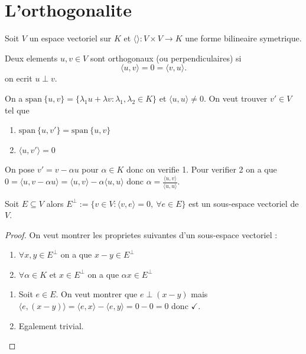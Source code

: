 

\section{L'orthogonalite}

Soit $V$ un espace vectoriel sur $K$ et $\langle  \rangle:V\times V\to K$ une forme bilineaire symetrique.
\begin{definition}
Deux elements $u,v\in V$ sont orthogonaux (ou perpendiculaires) si 
$$
\langle u,v \rangle =0=\langle v,u \rangle .
$$
on ecrit $u\perp v$.
\end{definition}

On a $\mathrm{span}~\{ u,v \}=\{ \lambda_{1}u+\lambda v:\lambda_{1},\lambda_{2}\in K \}$ et $\langle u,u \rangle\neq 0$. On veut trouver $v'\in V$ tel que 
\begin{enumerate}
\item $\mathrm{span}~\{ u,v' \}=\mathrm{span}~\{ u,v \}$
\item $\langle u,v' \rangle=0$
\end{enumerate}

On pose $v'=v-\alpha u$ pour $\alpha \in K$ donc on verifie 1. Pour verifier 2 on a que $0=\langle u,v-\alpha u \rangle=\langle u,v \rangle-\alpha \langle u,u \rangle$ donc $\alpha=\frac{\langle u,v \rangle}{\langle u,u \rangle}$.

\begin{proposition}
Soit $E\subseteq V$ alors $E^{\perp}:=\{ v\in V:\langle v,e \rangle=0,~\forall e\in E \}$ est un sous-espace vectoriel de $V$.
\end{proposition}
\begin{proof}
On veut montrer les proprietes suivantes d'un sous-espace vectoriel :
\begin{enumerate}
\item $\forall x,y\in E^{\perp}$ on a que $x-y\in E^{\perp}$
\item $\forall\alpha \in K$ et $x \in E^{\perp}$ on a que $\alpha x \in E^{\perp}$
\end{enumerate}

\begin{enumerate}
\item Soit $e\in E$. On veut montrer que $e \perp(x-y)$ mais $\langle e,(x-y) \rangle=\langle e,x \rangle-\langle e,y \rangle=0-0=0$ donc $\checkmark$.
\item Egalement trivial.
\end{enumerate}
\end{proof}

